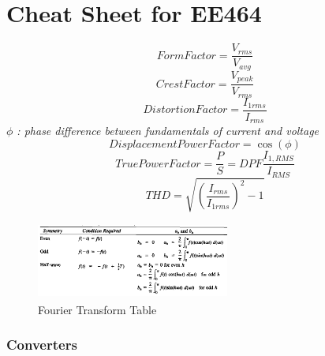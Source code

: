 \documentclass[twocolumn, ]{article}
\begin{document}
\section*{\small Cheat Sheet for EE464}


\begin{equation*}
Form Factor=\frac{V_{rms}}{V_{avg}}
\end{equation*}
\begin{equation*}
Crest Factor=\frac{V_{peak}}{V_{rms}}
\end{equation*}
\begin{equation*}
Distortion Factor=\frac{I_{1rms}}{I_{rms}}
\end{equation*}
\textit{$\phi$ : phase difference between fundamentals of current and voltage}
\begin{equation*}
Displacement Power Factor=\cos(\phi)
\end{equation*}
\begin{equation*}
True Power Factor=\frac{P}{S}=DPF \frac{I_{1,RMS}}{I_{RMS}}
\end{equation*}
\begin{equation*}
THD=\sqrt{(\frac{I_{rms}}{I_{1rms}})^2-1}
\end{equation*}

\begin{figure}[!ht]
	\includegraphics[width=2.5in,height=1in]{fouriert.png}
	\caption{Fourier Transform Table}
\end{figure}


\subsubsection*{Converters}
\end{document}
